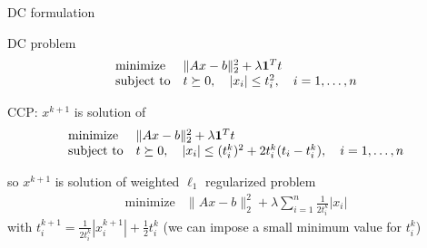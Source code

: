 \documentclass[aspectratio=169,11pt]{beamer}
\begin{document}
\begin{frame}{DC formulation}
\BIT
\item DC problem
\[
\begin{array}{ll} \mbox{minimize} & \|Ax-b\|_2^2 + \lambda \mathbf 1^T t\\
\mbox{subject to} & t \succeq 0, \quad |x_i| \leq t_i^2, \quad i=1,\ldots, n
\end{array}
\]
\item CCP: $x^{k+1}$ is solution of
\[
\begin{array}{ll} \mbox{minimize} & \|Ax-b\|_2^2 + \lambda \mathbf 1^Tt\\
\mbox{subject to} & t \succeq 0, \quad |x_i| \leq 
(t^k_i)^2+2t_i^k(t_i-t_i^k),\quad i=1,\ldots, n
\end{array}
\]
\item so $x^{k+1}$ is solution of weighted $\ell_1$ regularized problem
\[
\begin{array}{ll} \mbox{minimize} & \|Ax-b\|_2^2
 +\lambda \sum_{i=1}^n \frac{1}{2t_i^k} |x_i|
\end{array}
\]
with $t_i^{k+1}= \frac{1}{2t_i^k}|x_i^{k+1}| + \frac{1}{2}t_i^k$
(we can impose a small minimum value for $t_i^{k}$)
\EIT
\end{frame}
\end{document}
